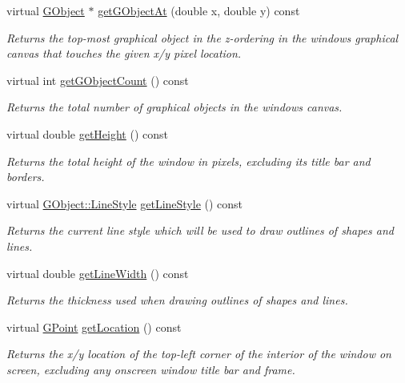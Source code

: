 \begin{DoxyCompactItemize}
virtual \mbox{\hyperlink{classsgl_1_1GObject}{G\+Object}} $\ast$ \mbox{\hyperlink{classsgl_1_1GWindow_ab174a229ac7a3e9a4cd135d68dcf0076}{get\+G\+Object\+At}} (double x, double y) const
\begin{DoxyCompactList}\small\item\em Returns the top-\/most graphical object in the z-\/ordering in the window\textquotesingle{}s graphical canvas that touches the given x/y pixel location. \end{DoxyCompactList}\item 
virtual int \mbox{\hyperlink{classsgl_1_1GWindow_ad59694124f2cdd71af9c137094df4d1f}{get\+G\+Object\+Count}} () const
\begin{DoxyCompactList}\small\item\em Returns the total number of graphical objects in the window\textquotesingle{}s canvas. \end{DoxyCompactList}\item 
virtual double \mbox{\hyperlink{classsgl_1_1GWindow_a1e7e353362434072875264cf95629f99}{get\+Height}} () const
\begin{DoxyCompactList}\small\item\em Returns the total height of the window in pixels, excluding its title bar and borders. \end{DoxyCompactList}\item 
virtual \mbox{\hyperlink{classsgl_1_1GObject_a86e0f5648542856159bb40775c854aa7}{G\+Object\+::\+Line\+Style}} \mbox{\hyperlink{classsgl_1_1GDrawingSurface_aaf1f5ea8281e5e3486662878d26f0a13}{get\+Line\+Style}} () const
\begin{DoxyCompactList}\small\item\em Returns the current line style which will be used to draw outlines of shapes and lines. \end{DoxyCompactList}\item 
virtual double \mbox{\hyperlink{classsgl_1_1GDrawingSurface_a85ff266dc3eb63d9f2d8e5a4487fd3c0}{get\+Line\+Width}} () const
\begin{DoxyCompactList}\small\item\em Returns the thickness used when drawing outlines of shapes and lines. \end{DoxyCompactList}\item 
virtual \mbox{\hyperlink{structsgl_1_1GPoint}{G\+Point}} \mbox{\hyperlink{classsgl_1_1GWindow_a4f83802015511edeb63b892830812c11}{get\+Location}} () const
\begin{DoxyCompactList}\small\item\em Returns the x/y location of the top-\/left corner of the interior of the window on screen, excluding any onscreen window title bar and frame. \end{DoxyCompactList}\item 

\end{DoxyCompactItemize}
